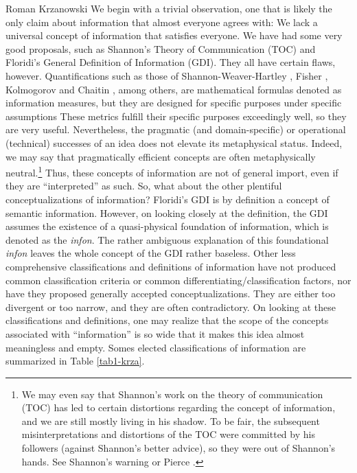 \begin{artengenv}{Roman Krzanowski}
\enlargethispage{\baselineskip}
We begin with a trivial observation, one that is likely the only claim about information that almost everyone agrees with: We lack a universal concept of information that satisfies everyone. We have had some very good proposals, such as Shannon's Theory of Communication (TOC) and Floridi's
\parencite*[][]{floridi_philosophy_2010} %
 General Definition of Information (GDI). They all have certain flaws, however. Quantifications such as those of Shannon-Weaver-Hartley 
\parencites[][]{shannon_mathematical_1948}[][]{shannon_mathematical_1964}[][]{hartley_transmission_1928}, %
 Fisher 
\parencite[][]{frieden_physics_1998}, %
Kolmogorov
\parencites*[][]{kolmogorov_1965}[Engl. tranls.][]{kolmogorov_three_1968} %
and Chaitin
\parencite*[][]{chaitin_meta_2004}, %
 among others, are mathematical formulas denoted as information measures, but they are designed for specific purposes under specific assumptions These metrics fulfill their specific purposes exceedingly well, so they are very useful. Nevertheless, the pragmatic (and domain-specific) or operational (technical) successes of an idea does not elevate its metaphysical status. Indeed, we may say that pragmatically efficient concepts are often metaphysically neutral.\footnote{We may even say that Shannon's work on the theory of communication (TOC) has led to certain distortions regarding the concept of information, and we are still mostly living in his shadow. To be fair, the subsequent misinterpretations and distortions of the TOC were committed by his followers (against Shannon's better advice), so they were out of Shannon's hands. See Shannon's warning 
\parencite[][]{shannon_bandwagon_1956} %
 or Pierce 
\parencite*[][]{pierce_symbols_1961}.%
} Thus, these concepts of information are not of general import, even if they are ``interpreted'' as such. So, what about the other plentiful conceptualizations of information? Floridi's GDI is by definition a concept of semantic information. However, on looking closely at the definition, the GDI assumes the existence of a quasi-physical foundation of information, which is denoted as the \textit{infon}. The rather ambiguous explanation of this foundational \textit{infon} leaves the whole concept of the GDI rather baseless. Other less comprehensive classifications and definitions of information have not produced common classification criteria or common differentiating/classification factors, nor have they proposed generally accepted conceptualizations. They are either too divergent or too narrow, and they are often contradictory. On looking at these classifications and definitions, one may realize that the scope of the concepts associated with ``information'' is so wide that it makes this idea almost meaningless and empty. Somes elected classifications of information are summarized in Table \ref{tab1-krza}.


\end{artengenv}
